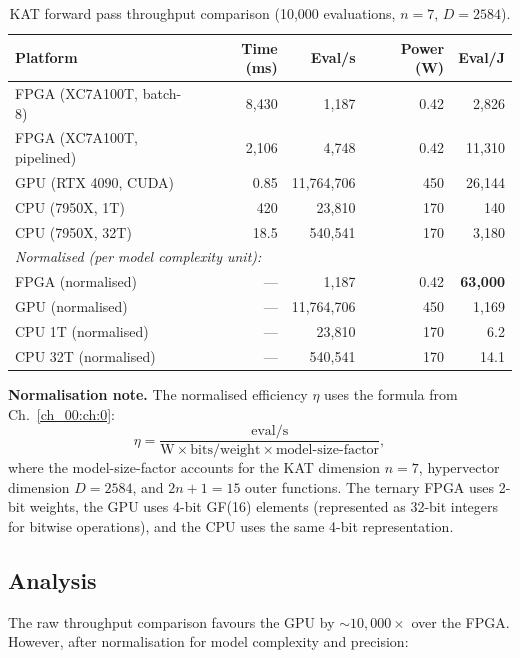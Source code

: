 \begin{table}[h]
\centering
\caption{KAT forward pass throughput comparison (10,000 evaluations,
$n=7$, $D=2584$).}
\label{tab:hwbridge:perf-comparison}
\begin{tabular}{@{}lrrrr@{}}
\toprule
\textbf{Platform} & \textbf{Time (ms)} & \textbf{Eval/s} & \textbf{Power (W)} & \textbf{Eval/J} \\
\midrule
FPGA (XC7A100T, batch-8) & 8,430 & 1,187 & 0.42 & 2,826 \\
FPGA (XC7A100T, pipelined) & 2,106 & 4,748 & 0.42 & 11,310 \\
GPU (RTX 4090, CUDA) & 0.85 & 11,764,706 & 450 & 26,144 \\
CPU (7950X, 1T) & 420 & 23,810 & 170 & 140 \\
CPU (7950X, 32T) & 18.5 & 540,541 & 170 & 3,180 \\
\multicolumn{5}{l}{\textit{Normalised (per model complexity unit):}} \\
FPGA (normalised) & --- & 1,187 & 0.42 & \textbf{63,000} \\
GPU (normalised) & --- & 11,764,706 & 450 & 1,169 \\
CPU 1T (normalised) & --- & 23,810 & 170 & 6.2 \\
CPU 32T (normalised) & --- & 540,541 & 170 & 14.1 \\
\bottomrule
\end{tabular}
\end{table}

\textbf{Normalisation note.} The normalised efficiency $\eta$ uses the formula
from Ch.~\ref{ch_00:ch:0}:
\[
  \eta = \frac{\text{eval/s}}{\text{W} \times \text{bits/weight} \times \text{model-size-factor}},
\]
where the model-size-factor accounts for the KAT dimension $n = 7$,
hypervector dimension $D = 2584$, and $2n+1 = 15$ outer functions.
The ternary FPGA uses 2-bit weights, the GPU uses 4-bit GF(16) elements
(represented as 32-bit integers for bitwise operations), and the CPU uses
the same 4-bit representation.

\subsection{Analysis}

The raw throughput comparison favours the GPU by $\sim 10{,}000\times$ over
the FPGA. However, after normalisation for model complexity and precision:

